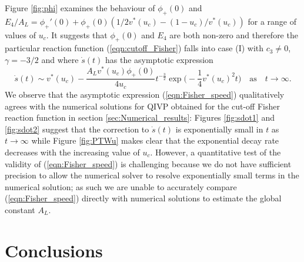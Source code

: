 \documentclass[11pt,a4paper]{article}
\newcommand{\eeref}[1]{(\ref{eqn:#1})}
\newcommand{\eelab}[1]{\label{eqn:#1}}
\newcommand{\ffref}[1]{\ref{fig:#1}}
\newcommand{\ssref}[1]{\ref{sec:#1}}
\def\beq{\begin{equation}}
\def\eeq{\end{equation}}
\begin{document}
Figure \ffref{phi} examines the behaviour of $\phi_+(0)$ and $E_4/A_L=\phi_+'(0)+\phi_+(0)(1/2v^*(u_c)-(1-u_c)/v^*(u_c))$ for a range of values of  $u_c$. 
%
It suggests that  $\phi_+(0)$ and $E_4$ are both non-zero and therefore  
the particular reaction function \eeref{cutoff_Fisher} falls into case (I) with $c_3 \neq 0$, $\gamma= - 3/2$ and where $\dot{s}(t)$ has the asymptotic expression 
\beq
\dot{s}(t) \sim  v^*(u_c) - \frac{A_L v^*(u_c) \phi_+(0)}{4 u_c} t^{-\frac{3}{2}}  \exp {  \bigg( - \frac{1}{4}  v^*(u_c)^2 t \bigg) }  \quad \mbox{as} \quad t \to \infty.  \eelab{Fisher_speed}
\eeq
%
 We observe that the asymptotic expression 
 \eeref{Fisher_speed} 
qualitatively  agrees with the numerical solutions for QIVP obtained for the cut-off Fisher reaction function in section \ssref{Numerical_results}:   
Figures  \ffref{sdot1} and \ffref{sdot2} suggest that 
 the correction to $\dot s(t)$ is exponentially small in $t$  as $t\to \infty$ while
  Figure \ffref{PTWu} makes clear that the exponential 
decay rate decreases with the increasing  value of $u_c$.
%
  However,  a quantitative test of the validity of   \eeref{Fisher_speed} 
  is challenging because 
 we do not have sufficient precision to allow the numerical solver to 
 resolve exponentially small terms in the numerical solution; as such we are unable to accurately compare  \eeref{Fisher_speed} directly with numerical solutions to estimate the global constant $A_L$. 



\section{Conclusions}
\end{document}
